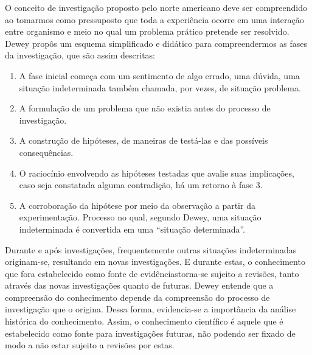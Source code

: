 \documentclass[12pt]{report}
\begin{document}
		O conceito de investigação proposto pelo norte americano deve ser compreendido ao tomarmos como pressuposto que toda a experiência ocorre em uma interação entre organismo e meio no qual um problema prático pretende ser resolvido.
		Dewey propôs um esquema simplificado e didático para compreendermos as fases da investigação, que são assim descritas:
	
			\begin{enumerate}
				\singlespacing
				\item A fase inicial começa com um sentimento de algo errado, uma dúvida, uma situação indeterminada também chamada, por vezes, de situação problema.
				\item A formulação de um problema que não existia antes do processo de investigação.
				\item A construção de hipóteses, de maneiras de testá-las e das possíveis consequências.
				\item O raciocínio envolvendo as hipóteses testadas que avalie suas implicações, caso seja constatada alguma contradição, há um retorno à fase 3.
				\item A corroboração da hipótese por meio da observação a partir da experimentação.
				Processo no qual, segundo Dewey, uma situação indeterminada é convertida em uma “situação determinada”.
		\end{enumerate}
	
		\onehalfspacing 
		Durante e após investigações, frequentemente outras situações indeterminadas originam-se, resultando em novas investigações.
		E durante estas, o conhecimento que fora estabelecido como fonte de evidênciastorna-se sujeito a revisões, tanto através das novas investigações quanto de futuras.
		Dewey entende que a compreensão do conhecimento depende da compreensão do processo de investigação que o origina. Dessa forma, evidencia-se a importância da análise histórica do conhecimento.
		Assim, o conhecimento científico é aquele que é estabelecido como fonte para investigações futuras, não podendo ser fixado de modo a não estar sujeito a revisões por estas.
		
\end{document}
